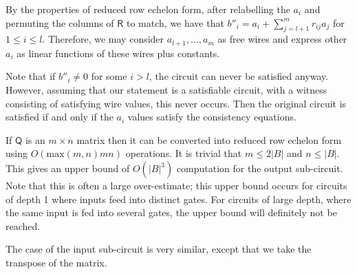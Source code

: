 By the properties of reduced row echelon form, after relabelling the $a_i$ and permuting the columns of $\mathsf{R}$ to match, we have that $b''_i=a_i + \sum_{j=l+1}^m r_{ij} a_j$ for $1\leq i\leq l$. Therefore, we may consider $a_{l+1},\ldots,a_m$ as free wires and express other $a_i$ as linear functions of these wires plus constants.

Note that if $b''_i\neq 0$ for some $i>l$, the circuit can never be satisfied anyway. However, assuming that our statement is a satisfiable circuit, with a witness consisting of satisfying wire values, this never occurs. Then the original circuit is satisfied if and only if the $a_i$ values satisfy the consistency equations.

If $\mathsf{Q}$ is an $m\times n$ matrix then it can be converted into reduced row echelon form using $O(\mathrm{max}(m,n) mn)$ operations. It is trivial that $m\leq 2\left| B \right|$ and $n\leq \left| B \right|$. This gives an upper bound of $O(\left| B \right|^3)$ computation for the output sub-circuit. 
%
Note that this is often a large over-estimate; this upper bound occurs for circuits of depth 1 where inputs feed into distinct gates. For circuits of large depth, where the same input is fed into several gates, the upper bound will definitely not be reached. %

The case of the input sub-circuit is very similar, except that we take the transpose of the matrix.

